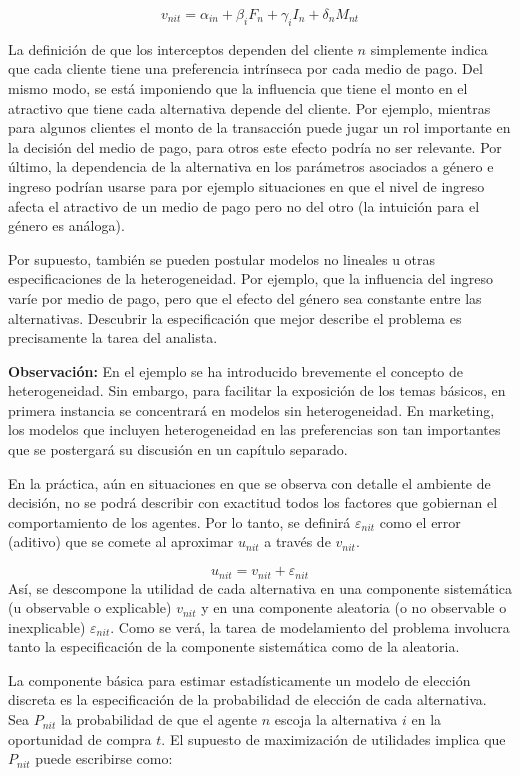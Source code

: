 \documentclass[
]{book}
\begin{document}
\[v_{nit} = \alpha_{in} + \beta_i F_n + \gamma_i I_n + \delta_n M_{nt}\]

La definición de que los interceptos dependen del cliente \(n\) simplemente indica que cada cliente tiene una preferencia intrínseca por cada medio de pago. Del mismo modo, se está imponiendo que la influencia que tiene el monto en el atractivo que tiene cada alternativa depende del cliente. Por ejemplo, mientras para algunos clientes el monto de la transacción puede jugar un rol importante en la decisión del medio de pago, para otros este efecto podría no ser relevante. Por último, la dependencia de la alternativa en los parámetros asociados a género e ingreso podrían usarse para por ejemplo situaciones en que el nivel de ingreso afecta el atractivo de un medio de pago pero no del otro (la intuición para el género es análoga).

Por supuesto, también se pueden postular modelos no lineales u otras especificaciones de la heterogeneidad. Por ejemplo, que la influencia del ingreso varíe por medio de pago, pero que
el efecto del género sea constante entre las alternativas. Descubrir la especificación que mejor describe el problema es precisamente la tarea del analista.

\textbf{Observación:} En el ejemplo se ha introducido brevemente el concepto de heterogeneidad. Sin embargo, para facilitar la exposición de los temas básicos, en primera instancia se concentrará en modelos sin heterogeneidad. En marketing, los modelos que incluyen heterogeneidad en las preferencias son tan importantes que se postergará su discusión en un capítulo separado.

En la práctica, aún en situaciones en que se observa con detalle el ambiente de decisión, no se podrá describir con exactitud todos los factores que gobiernan el comportamiento de los agentes. Por lo tanto, se definirá \(\varepsilon_{nit}\) como el error (aditivo) que se comete al aproximar \(u_{nit}\) a través de \(v_{nit}\).

\[u_{nit} = v_{nit} + \varepsilon_{nit}\]
Así, se descompone la utilidad de cada alternativa en una componente sistemática (u observable o explicable) \(v_{nit}\) y en una componente aleatoria (o no observable o inexplicable) \(\varepsilon_{nit}\). Como se verá, la tarea de modelamiento del problema involucra tanto la especificación de la componente sistemática como de la aleatoria.

La componente básica para estimar estadísticamente un modelo de elección discreta es la especificación de la probabilidad de elección de cada alternativa. Sea \(P_{nit}\) la probabilidad de que el agente \(n\) escoja la alternativa \(i\) en la oportunidad de compra \(t\). El supuesto de maximización de utilidades implica que \(P_{nit}\) puede escribirse como:
\end{document}
